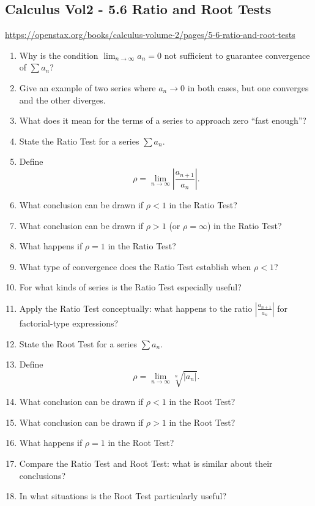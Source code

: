 \subsection{Calculus Vol2 - 5.6 Ratio and Root Tests}

\url{https://openstax.org/books/calculus-volume-2/pages/5-6-ratio-and-root-tests}

\begin{enumerate}
  \item Why is the condition \(\lim_{n\to\infty}a_{n} = 0\) not sufficient to guarantee convergence of \(\sum a_{n}\)?
  \item Give an example of two series where \(a_{n} \to 0\) in both cases, but one converges and the other diverges.
  \item What does it mean for the terms of a series to approach zero “fast enough”?
  \item State the Ratio Test for a series \(\sum a_{n}\).
  \item Define
    \[ \rho = \lim_{n\to\infty}\left| \frac{a_{n+1}}{a_{n}}\right|. \]
  \item What conclusion can be drawn if \(\rho < 1\) in the Ratio Test?
  \item What conclusion can be drawn if \(\rho > 1\) (or \(\rho = \infty\)) in the Ratio Test?
  \item What happens if \(\rho = 1\) in the Ratio Test?
  \item What type of convergence does the Ratio Test establish when \(\rho < 1\)?
  \item For what kinds of series is the Ratio Test especially useful?
  \item Apply the Ratio Test conceptually: what happens to the ratio \(\left|\frac{a_{n+1}}{a_{n}}\right|\) for factorial-type expressions?
  \item State the Root Test for a series \(\sum a_{n}\).
  \item Define
    \[ \rho = \lim_{n\to\infty}\sqrt[n]{|a_{n}|}. \]
  \item What conclusion can be drawn if \(\rho < 1\) in the Root Test?
  \item What conclusion can be drawn if \(\rho > 1\) in the Root Test?
  \item What happens if \(\rho = 1\) in the Root Test?
  \item Compare the Ratio Test and Root Test: what is similar about their conclusions?
  \item In what situations is the Root Test particularly useful?

\end{enumerate}
